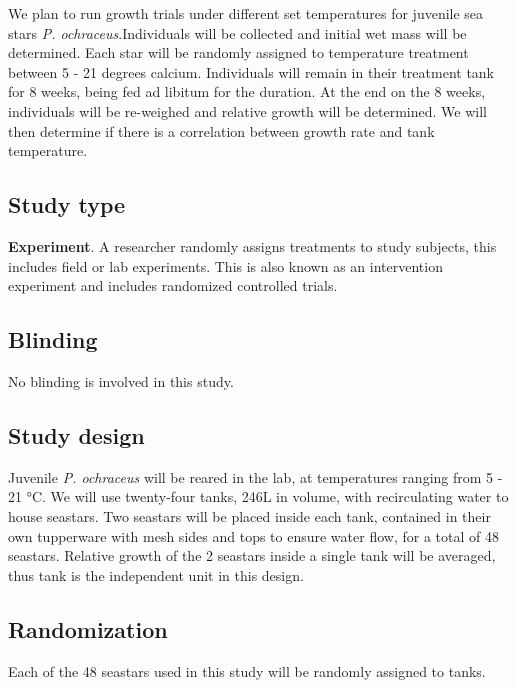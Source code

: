\documentclass[]{article}
\begin{document}
We plan to run growth trials under different set temperatures for
juvenile sea stars \emph{P. ochraceus}.Individuals will be collected and
initial wet mass will be determined. Each star will be randomly assigned
to temperature treatment between 5 - 21 degrees calcium. Individuals
will remain in their treatment tank for 8 weeks, being fed ad libitum
for the duration. At the end on the 8 weeks, individuals will be
re-weighed and relative growth will be determined. We will then
determine if there is a correlation between growth rate and tank
temperature.

\hypertarget{study-type}{%
\subsection{Study type}\label{study-type}}

\textbf{Experiment}. A researcher randomly assigns treatments to study
subjects, this includes field or lab experiments. This is also known as
an intervention experiment and includes randomized controlled trials.

\hypertarget{blinding}{%
\subsection{Blinding}\label{blinding}}

No blinding is involved in this study.

\hypertarget{study-design}{%
\subsection{Study design}\label{study-design}}

Juvenile \emph{P. ochraceus} will be reared in the lab, at temperatures
ranging from 5 - 21 °C. We will use twenty-four tanks, 246L in volume,
with recirculating water to house seastars. Two seastars will be placed
inside each tank, contained in their own tupperware with mesh sides and
tops to ensure water flow, for a total of 48 seastars. Relative growth
of the 2 seastars inside a single tank will be averaged, thus tank is
the independent unit in this design.

\hypertarget{randomization}{%
\subsection{Randomization}\label{randomization}}

Each of the 48 seastars used in this study will be randomly assigned to
tanks.
\end{document}
